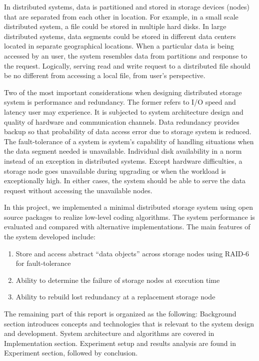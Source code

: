 In distributed systems, data is partitioned and stored in storage devices (nodes) that are separated from each other in location. For example, in a small scale distributed system, a file could be stored in multiple hard disks. In large distributed systems, data segments could be stored in different data centers located in separate geographical locations. When a particular data is being accessed by an user, the system resembles data from partitions and response to the request. Logically, serving read and write request to a distributed file should be no different from accessing a local file, from user's perspective.

Two of the most important considerations when designing distributed storage system is performance and redundancy. The former refers to I/O speed and latency user may experience. It is subjected to system architecture design and quality of hardware and communication channels. Data redundancy provides backup so that probability of data access error due to storage system is reduced. The fault-tolerance of a system is system's capability of handling situations when the data segment needed is unavailable. Individual disk availability in a norm instead of an exception in distributed systems. Except hardware difficulties, a storage node goes unavailable during upgrading or when the workload is exceptionally high. In either cases, the system should be able to serve the data request without accessing the unavailable nodes.

In this project, we implemented a minimal distributed storage system using open source packages to realize low-level coding algorithms. The system performance is evaluated and compared with alternative implementations. The main features of the system developed include: 

\begin{enumerate}
	\item Store and access abstract “data objects” across storage nodes using RAID-6 for fault-tolerance
	
	\item Ability to determine the failure of storage nodes at execution time
	
	\item Ability to rebuild lost redundancy at a replacement storage node
\end{enumerate}


The remaining part of this report is organized as the following: Background section introduces concepts and technologies that is relevant to the system design and development. System architecture and algorithms are covered in Implementation section. Experiment setup and results analysis are found in Experiment section, followed by conclusion.